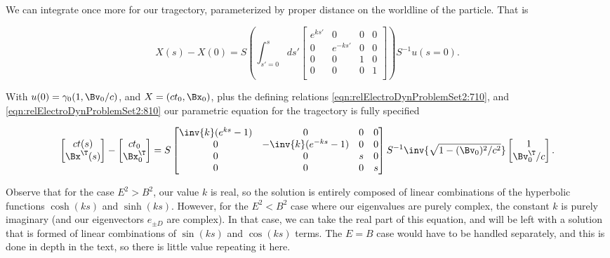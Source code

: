 We can integrate once more for our tragectory, parameterized by proper distance on the worldline of the particle.  That is

\begin{equation}\label{eqn:relElectroDynProblemSet2:890}
X(s) - X(0) 
= S \left( \int_{s'=0}^s 
ds'
\begin{bmatrix}
e^{ks'} & 0 & 0 & 0 \\
0 & e^{-ks'} & 0 & 0 \\
0 & 0 & 1 & 0 \\
0 & 0 & 0 & 1 \\
\end{bmatrix} \right) S^{-1} u(s=0).
\end{equation}

With $u(0) = \gamma_0 (1, \Bv_0/c)$, and $X = (c t_0, \Bx_0)$, plus the defining relations \ref{eqn:relElectroDynProblemSet2:710}, and \ref{eqn:relElectroDynProblemSet2:810} our parametric equation for the tragectory is fully specified

\begin{equation}\label{eqn:relElectroDynProblemSet2:910}
\begin{bmatrix}
c t(s) \\
\Bx^\T(s)
\end{bmatrix}
- 
\begin{bmatrix}
c t_0 \\
\Bx_0^\T
\end{bmatrix}
= S 
\begin{bmatrix}
\inv{k}(e^{ks} -1) & 0 & 0 & 0 \\
0 & -\inv{k}(e^{-ks} -1) & 0 & 0 \\
0 & 0 & s & 0 \\
0 & 0 & 0 & s \\
\end{bmatrix} S^{-1} \inv{\sqrt{1 - (\Bv_0)^2/c^2}}
\begin{bmatrix}
1 \\
\Bv_0^\T/c
\end{bmatrix}.
\end{equation}

Observe that for the case $E^2 > B^2$, our value $k$ is real, so the solution is entirely composed of linear combinations of the hyperbolic functions $\cosh(k s)$ and $\sinh(ks)$.  However, for the $E^2 < B^2$ case where our eigenvalues are purely complex, the constant $k$ is purely imaginary (and our eigenvectors $e_{\pm D}$ are complex).  In that case, we can take the real part of this equation, and will be left with a solution that is formed of linear combinations of $\sin(ks)$ and $\cos(ks)$ terms.  The $E = B$ case would have to be handled separately, and this is done in depth in the text, so there is little value repeating it here.

